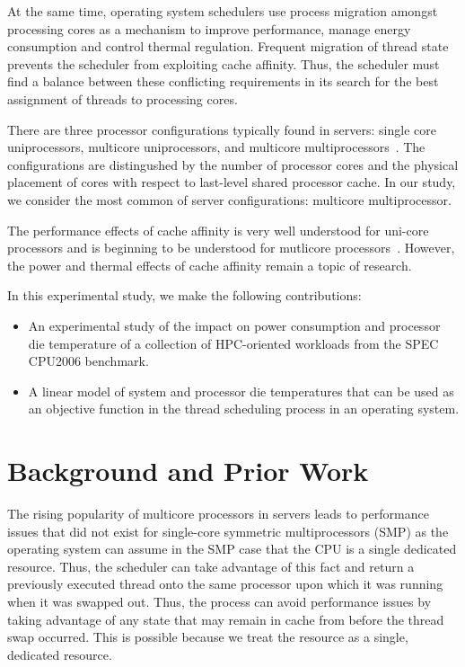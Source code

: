 \documentclass[12pt,onecolumn]{ULieeetran}
\begin{document}
At the same time, operating system schedulers use process migration
amongst processing cores as a mechanism to improve performance, manage
energy consumption and control thermal regulation. Frequent migration of
thread state prevents the scheduler from exploiting cache affinity.
Thus, the scheduler must find a balance between these conflicting
requirements in its search for the best assignment of threads to
processing cores.

There are three processor configurations typically found in servers:
single core uniprocessors, multicore uniprocessors, and multicore
multiprocessors~\cite{Kazempour2008}.  The configurations are
distingushed by the number of processor cores and the physical
placement of cores with respect to last-level shared processor cache.
In our study, we consider the most common of server configurations:
multicore multiprocessor.

The performance effects of cache affinity is very well understood for
uni-core processors and is beginning to be understood for mutlicore
processors~\cite{Kazempour2008}.  However, the power and thermal
effects of cache affinity remain a topic of research.  

In this experimental study, we make the following contributions:
\begin{itemize}
\item An experimental study of the impact on power consumption and
  processor die temperature of a collection of HPC-oriented workloads
  from the SPEC CPU2006 benchmark.
\item A linear model of system and processor die temperatures that can
  be used as an objective function in the thread scheduling process in
  an operating system.
\end{itemize}

\section{Background and Prior Work}
\label{sec:prior}

The rising popularity of multicore processors in servers leads to
performance issues that did not exist for single-core symmetric
multiprocessors (SMP) as the operating system can assume in the SMP case
that the CPU is a single dedicated resource.  Thus, the scheduler can
take advantage of this fact and return a previously executed thread onto
the same processor upon which it was running when it was swapped out.
Thus, the process can avoid performance issues by taking advantage of
any state that may remain in cache from before the thread swap
occurred.  This is possible because we treat the resource as a single,
dedicated resource.
\end{document}
